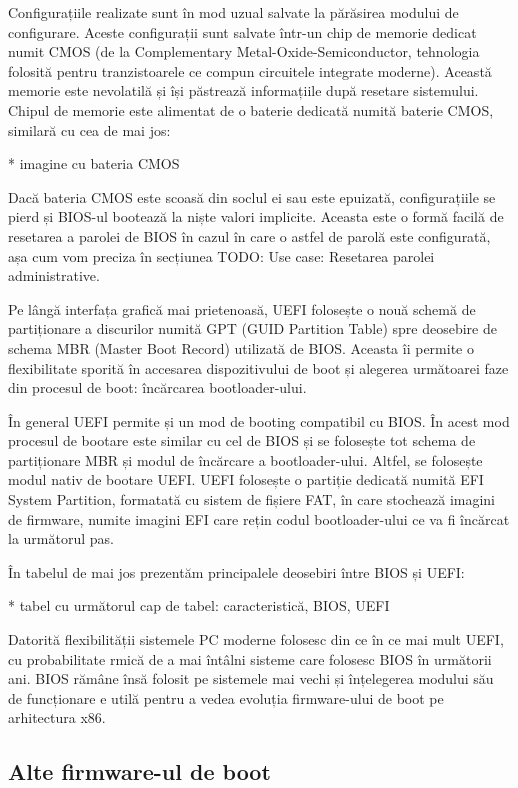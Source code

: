 Configurațiile realizate sunt în mod uzual salvate la părăsirea modului de
configurare. Aceste configurații sunt salvate într-un chip de memorie dedicat
numit CMOS (de la Complementary Metal-Oxide-Semiconductor, tehnologia folosită
pentru tranzistoarele ce compun circuitele integrate moderne). Această memorie
este nevolatilă și își păstrează informațiile după resetare sistemului. Chipul
de memorie este alimentat de o baterie dedicată numită baterie CMOS, similară cu
cea de mai jos:

* imagine cu bateria CMOS

Dacă bateria CMOS este scoasă din soclul ei sau este epuizată, configurațiile se
pierd și BIOS-ul bootează la niște valori implicite. Aceasta este o formă facilă
de resetarea a parolei de BIOS în cazul în care o astfel de parolă este
configurată, așa cum vom preciza în secțiunea TODO: Use case: Resetarea parolei
administrative.

Pe lângă interfața grafică mai prietenoasă, UEFI folosește o nouă schemă de
partiționare a discurilor numită GPT (GUID Partition Table) spre deosebire de
schema MBR (Master Boot Record) utilizată de BIOS. Aceasta îi permite o
flexibilitate sporită în accesarea dispozitivului de boot și alegerea următoarei
faze din procesul de boot: încărcarea bootloader-ului.

În general UEFI permite și un mod de booting compatibil cu BIOS. În acest mod
procesul de bootare este similar cu cel de BIOS și se folosește tot schema de
partiționare MBR și modul de încărcare a bootloader-ului. Altfel, se folosește
modul nativ de bootare UEFI. UEFI folosește o partiție dedicată numită EFI
System Partition, formatată cu sistem de fișiere FAT, în care stochează imagini
de firmware, numite imagini EFI care rețin codul bootloader-ului ce va fi
încărcat la următorul pas.

În tabelul de mai jos prezentăm principalele deosebiri între BIOS și UEFI:

* tabel cu următorul cap de tabel: caracteristică, BIOS, UEFI

Datorită flexibilității sistemele PC moderne folosesc din ce în ce mai mult
UEFI, cu probabilitate rmică de a mai întâlni sisteme care folosesc BIOS în
următorii ani. BIOS rămâne însă folosit pe sistemele mai vechi și înțelegerea
modului său de funcționare e utilă pentru a vedea evoluția firmware-ului de boot
pe arhitectura x86.

\subsection{Alte firmware-ul de boot}
\label{sec:boot-firmware-uefi}

